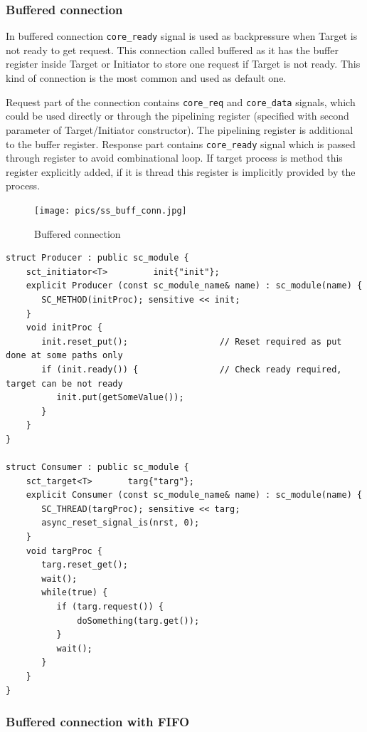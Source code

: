 \subsubsection{Buffered connection}

In buffered connection {\tt core\_ready} signal is used as backpressure when Target is not ready to get request. This connection called buffered as it has the buffer register inside Target or Initiator to store one request if Target is not ready. This kind of connection is the most common and used as default one.

Request part of the connection contains {\tt core\_req} and {\tt core\_data} signals, which could be used directly or through the pipelining register (specified with second parameter of Target/Initiator constructor). The pipelining register is additional to the buffer register. Response part contains {\tt core\_ready} signal which is passed through register to avoid combinational loop. If target process is method this register explicitly added, if it is thread this register is implicitly provided by the process.

\begin{figure}[!htb]
\centering
\texttt{[image: pics/ss\_buff\_conn.jpg]}
\caption{Buffered connection}
\label{fig:ss_usage}
\end{figure}

\begin{lstlisting}[style=mycpp]
struct Producer : public sc_module {
    sct_initiator<T>         init{"init"};
    explicit Producer (const sc_module_name& name) : sc_module(name) {
       SC_METHOD(initProc); sensitive << init;
    } 
    void initProc {
       init.reset_put();                  // Reset required as put done at some paths only  
       if (init.ready()) {                // Check ready required, target can be not ready 
          init.put(getSomeValue());
       }
    }
}

struct Consumer : public sc_module {
    sct_target<T>       targ{"targ"};
    explicit Consumer (const sc_module_name& name) : sc_module(name) {
       SC_THREAD(targProc); sensitive << targ;
       async_reset_signal_is(nrst, 0);
    } 
    void targProc {
       targ.reset_get();
       wait();
       while(true) {
          if (targ.request()) {      
              doSomething(targ.get()); 
          }
          wait(); 
       }
    }
}
\end{lstlisting}


\subsubsection{Buffered connection with FIFO}

